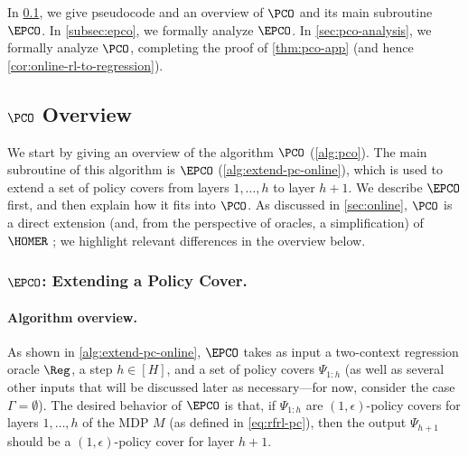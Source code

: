 In \cref{sec:pco-overview}, we give pseudocode and an overview of $\PCO$ and its main subroutine $\EPCO$. In \cref{subsec:epco}, we formally analyze $\EPCO$. In \cref{sec:pco-analysis}, we formally analyze $\PCO$, completing the proof of \cref{thm:pco-app} (and hence \cref{cor:online-rl-to-regression}).

\subsection{$\PCO$ Overview}\label{sec:pco-overview}

We start by giving an overview of the algorithm $\PCO$ (\cref{alg:pco}). The main subroutine of this algorithm is $\EPCO$ (\cref{alg:extend-pc-online}), which is used to extend a set of policy covers from layers $1,\dots,h$ to layer $h+1$. We describe $\EPCO$ first, and then explain how it fits into $\PCO$. As discussed in \cref{sec:online}, $\PCO$ is a direct extension (and, from the perspective of oracles, a simplification) of $\HOMER$ \citep{misra2020kinematic}; we highlight relevant differences in the overview below.

\colt{}

\subsubsection{$\EPCO$: Extending a Policy Cover.} 

\paragraph{Algorithm overview.} As shown in \cref{alg:extend-pc-online}, $\EPCO$ takes as input a two-context regression oracle $\Reg$, a step $h \in [H]$, and a set of policy covers $\Psi_{1:h}$ (as well as several other inputs that will be discussed later as necessary---for now, consider the case $\Gamma = \emptyset$). The desired behavior of $\EPCO$ is that, if $\Psi_{1:h}$ are $(1,\epsilon)$-policy covers for layers $1,\dots,h$ of the MDP $M$ (as defined in \cref{eq:rfrl-pc}), then the output $\Psi_{h+1}$ should be a $(1,\epsilon)$-policy cover for layer $h+1$.

